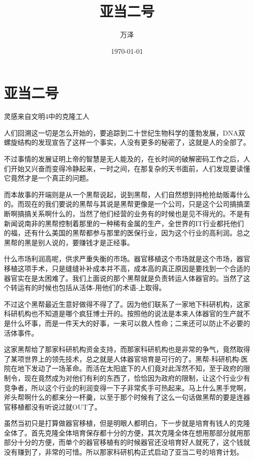 \documentclass[11pt,oneside]{article}
\author{万泽}
\date{\today}
\title{亚当二号}
\begin{document}
\maketitle
\tableofcontents



\section{亚当二号}
\label{sec-1}
灵感来自文明4中的克隆工人

人们回溯这一切是怎么开始的，要追踪到二十世纪生物科学的蓬勃发展，DNA双螺旋结构的发现宣告了这样一个事实，人没有更多的秘密了，这就是人的全部了。

不过事情的发展证明上帝的智慧是无人能及的，在长时间的破解密码工作之后，人们开始又兴奋而变得冷静起来，一时之间，在那复杂的天书面前，人们发现要读懂它竟然才是一个真正的问题。

而本故事的开端则是从一个黑帮说起，说到黑帮，人们自然想到持枪抢劫贩毒什么的。而现在的我们要说的黑帮与其说是黑帮更像是一个公司，只是这个公司搞搞垄断啊搞搞关系啊什么的，当然了他们经营的业务有的时候也是见不得光的。不是有新闻说南非的黑帮控制着那里的一种稀有金属的生产，全世界的IT行业都托他们的福，还有什么美国的黑帮都参与那里的医保行业，因为这个行业的高利润。总之黑帮的黑是别人说的，要赚钱才是正经事。

什么市场利润高呢，供求严重失衡的市场。器官移植这个市场就是这个市场，器官移植这项手术，只是缝缝补补成本并不高，成本高的真正原因是要找到一个合适的器官实在是太困难了。我们上面说的那个黑帮就是负责转运人体器官的。当然了这个转运有的时候也包括从活体-用他们的术语-上取得。

不过这个黑帮最近生意好做得不得了了。因为他们联系了一家地下科研机构，这家科研机构也不知道是哪个疯狂博士开的。按照他的说法是本来人体器官的生产就不是什么坏事，而是一件天大的好事，一来可以救人性命；二来还可以防止不必要的活体事件。

这家黑帮给了那家科研机构资金支持，而那家科研机构也是非常的争气，竟然取得了某项世界上的领先技术，总之就是人体器官培育是可行的了。黑帮-科研机构-医院在地下发动了一场革命。而活在太阳底下的人们竟对此浑然不知，至于政府的限制令，现在竟然成为对他们有利的东西了，恰恰因为政府的限制，让这个行业少有竞争者，所以这个行业的利润变得一下子非常炙手可热起来。马上什么黑手党啊，斧头帮啊什么的都来分一杯羹，以至于那个时候有了这么一句话做黑帮的要是连器官移植都没有听说过就OUT了。

虽然当初只是打算做器官移植，但是明眼人都明白，下一步就是培育有钱人的克隆全体了。首先克隆全体培育保存都十分的方便，其次克隆全体在想用那部分就用那部分十分的方便，而单个的器官移植有的时候器官还没培育好人就死了，这个钱就没有赚到了，非常的可惜。所以那家科研机构正式启动了亚当二号的培育计划。
\end{document}
